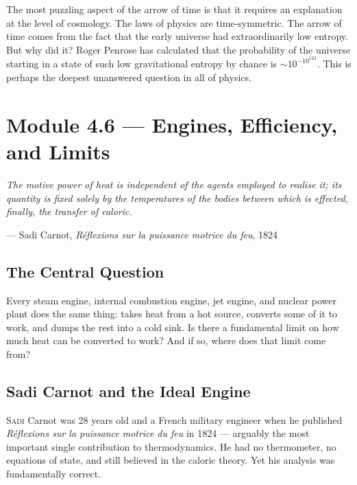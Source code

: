 \documentclass[12pt, a4paper, twoside]{book}
\begin{document}
\begin{deepquestion}
The most puzzling aspect of the arrow of time is that it requires an explanation at the level of cosmology. The laws of physics are time-symmetric. The arrow of time comes from the fact that the early universe had extraordinarily low entropy. But why did it? Roger Penrose has calculated that the probability of the universe starting in a state of such low gravitational entropy by chance is $\sim 10^{-10^{123}}$. This is perhaps the deepest unanswered question in all of physics.
\end{deepquestion}

\section{Module 4.6 — Engines, Efficiency, and Limits}
\label{sec:carnot}

\epigraph{\itshape
  The motive power of heat is independent of the agents employed to realise it;
  its quantity is fixed solely by the temperatures of the bodies between which
  is effected, finally, the transfer of caloric.
}{--- Sadi Carnot, \textit{R\'eflexions sur la puissance motrice du feu}, 1824}

\subsection{The Central Question}

\begin{puzzlebox}
Every steam engine, internal combustion engine, jet engine, and nuclear power plant does the same thing: takes heat from a hot source, converts some of it to work, and dumps the rest into a cold sink. Is there a fundamental limit on how much heat can be converted to work? And if so, where does that limit come from?
\end{puzzlebox}

\subsection{Sadi Carnot and the Ideal Engine}

\lettrine[lines=3,loversize=0.08]{\textcolor{accent}{S}}{adi} Carnot was 28 years old and a French military engineer when he published \textit{R\'eflexions sur la puissance motrice du feu} in 1824 --- arguably the most important single contribution to thermodynamics. He had no thermometer, no equations of state, and still believed in the caloric theory. Yet his analysis was fundamentally correct.
\end{document}
